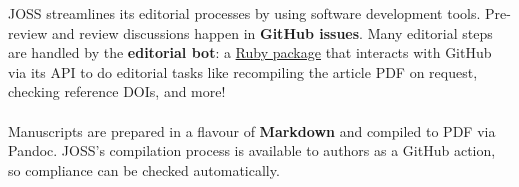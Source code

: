 \documentclass[25pt, a1paper, portrait]{tikzposter}
\begin{document}
\begin{columns}

{JOSS streamlines its editorial processes by using software
  development tools.  Pre-review and review discussions happen in
  \textbf{GitHub issues}.  Many editorial steps are handled by the \textbf{editorial
  bot}: a \href{https://buffy.readthedocs.io/}{Ruby package}
  that interacts with GitHub via its API to do editorial tasks
  like recompiling the article PDF on request, checking reference DOIs, and more! \\
  \\
  Manuscripts are prepared in a flavour of \textbf{Markdown} and compiled to
  PDF via Pandoc.  JOSS's compilation process is available to authors
  as a GitHub action, so compliance can be checked automatically.
}

\end{columns}
\end{document}
